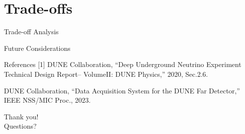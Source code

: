 \documentclass[aspectratio=169]{beamer}
\begin{document}

\section{Trade-offs}
\begin{frame}{Trade-off Analysis}
\end{frame}

\begin{frame}{Future Considerations}
\end{frame}

\begin{frame}[allowframebreaks]{References}
\small
[1] DUNE Collaboration, “Deep Underground Neutrino Experiment Technical Design Report– VolumeII: DUNE Physics,” 2020, Sec.2.6.\par
[2] DUNE Collaboration, “Data Acquisition System for the DUNE Far Detector,” IEEE NSS/MIC Proc., 2023.\\
\end{frame}

\begin{frame}[standout]
Thank you! \\
Questions?
\end{frame}
\end{document}
